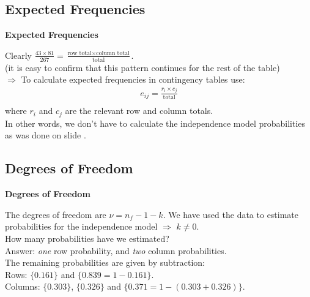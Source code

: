 \documentclass[compress]{beamer}        %
\makeatletter
\newcommand{\tcb}{\textcolor{beamer@blendedblue}}
\makeatother
\begin{document}
\subsection{Expected Frequencies}
\begin{frame}{\bf \tcb{Expected Frequencies}}

Clearly $\frac{43\times81}{267} = \frac{\text{row total}\times\text{column total}}{\text{total}}$.\\[0.2cm]
{\footnotesize(it is easy to confirm that this pattern continues for the rest of the table)}\\[0.9cm]


$\Rightarrow$ To calculate expected frequencies in contingency tables use:\\[-0.1cm]
\begin{align*}
\boxed{e_{ij} = \frac{r_i\times c_j}{\text{total}}}\\[-0.2cm]
\end{align*}
where $r_i$ and $c_j$ are the relevant row and column totals.\\[0.9cm]

In other words, we don't have to calculate the independence model probabilities as was done on slide \pageref{indep}.

\end{frame}




\subsection{Degrees of Freedom}
\begin{frame}{\bf \tcb{Degrees of Freedom}}

The degrees of freedom are $\nu = n_f - 1 - k$. We have used the data to estimate probabilities for the independence model $\Rightarrow$ $k \ne 0$.\\[1cm]

How many probabilities have we estimated?\\[0.3cm]
Answer: \emph{one} row probability, and \emph{two} column probabilities.\\[1cm]

The remaining probabilities are given by subtraction:\\[0.5cm]

Rows: $\{0.161\}$ and $\{0.839 = 1 - 0.161\}$.\\[0.4cm]
Columns: $\{0.303\}$, $\{0.326\}$ and $\{0.371 = 1 - (0.303+0.326)\}$.

\end{frame}
\end{document}
